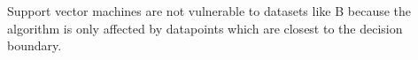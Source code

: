 \begin{answer}
Support vector machines are not vulnerable to datasets like B because the algorithm is only affected by datapoints which are closest to the decision boundary.
\end{answer}

